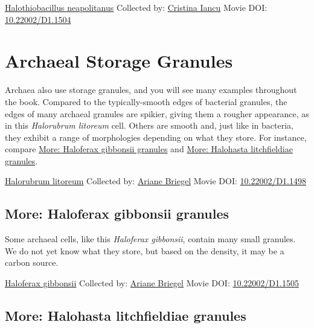 \documentclass[]{tufte-book}
\begin{document}
\label{fig:4-9b}\protect\hyperlink{tree}{Halothiobacillus neapolitanus} Collected by: \protect\hyperlink{cristina_iancu}{Cristina Iancu} Movie DOI: \href{https://doi.org/10.22002/D1.1504}{10.22002/D1.1504}

\hypertarget{archaeal-storage-granules}{%
\section{Archaeal Storage Granules}\label{archaeal-storage-granules}}

Archaea also use storage granules, and you will see many examples throughout the book. Compared to the typically-smooth edges of bacterial granules, the edges of many archaeal granules are spikier, giving them a rougher appearance, as in this \emph{Halorubrum litoreum} cell. Others are smooth and, just like in bacteria, they exhibit a range of morphologies depending on what they store. For instance, compare \protect\hyperlink{Haloferax_gibbonsii_granules}{More: Haloferax gibbonsii granules} and \protect\hyperlink{Halohasta_litchfieldiae_granules}{More: Halohasta litchfieldiae granules}.



\hypertarget{htmlwidget-4ca9a7ba98b71620b6ee}{}

\label{fig:4-10}\protect\hyperlink{tree}{Halorubrum litoreum} Collected by: \protect\hyperlink{ariane_briegel}{Ariane Briegel} Movie DOI: \href{https://doi.org/10.22002/D1.1498}{10.22002/D1.1498}

\hypertarget{Haloferax_gibbonsii_granules}{%
\subsection*{More: Haloferax gibbonsii granules}\label{Haloferax_gibbonsii_granules}}

Some archaeal cells, like this \emph{Haloferax gibbonsii}, contain many small granules. We do not yet know what they store, but based on the density, it may be a carbon source.



\hypertarget{htmlwidget-1134e9252f96c81ffa40}{}

\label{fig:4-10a}\protect\hyperlink{tree}{Haloferax gibbonsii} Collected by: \protect\hyperlink{ariane_briegel}{Ariane Briegel} Movie DOI: \href{https://doi.org/10.22002/D1.1505}{10.22002/D1.1505}

\hypertarget{Halohasta_litchfieldiae_granules}{%
\subsection*{More: Halohasta litchfieldiae granules}\label{Halohasta_litchfieldiae_granules}}
\end{document}
